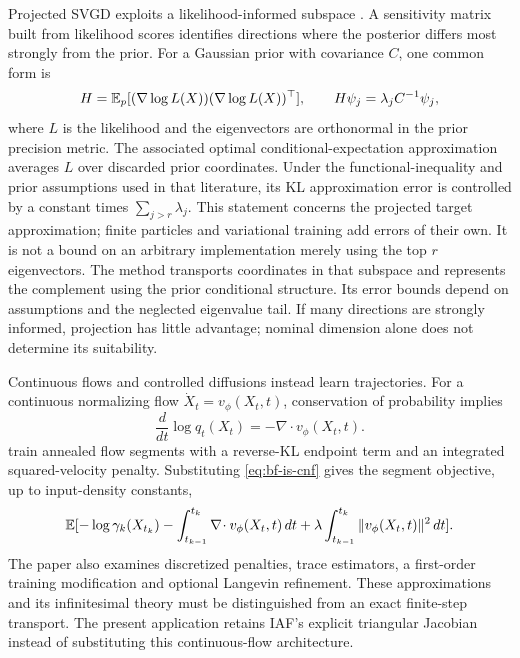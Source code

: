 Projected SVGD exploits a likelihood-informed subspace
\citep{chen2020psvgd}. A sensitivity matrix built from likelihood scores
identifies directions where the posterior differs most strongly from the prior.
For a Gaussian prior with covariance $C$, one common form is
\begin{equation}
 H=\mathbb{E}_p[(\nabla\log L(X))(\nabla\log L(X))^\top],\qquad
 H\psi_j=\lambda_j C^{-1}\psi_j,
 \label{eq:bf-is-informed-subspace}
\end{equation}
where $L$ is the likelihood and the eigenvectors are orthonormal in the prior
precision metric. The associated optimal conditional-expectation approximation
averages $L$ over discarded prior coordinates. Under the functional-inequality
and prior assumptions used in that literature, its KL approximation error is
controlled by a constant times $\sum_{j>r}\lambda_j$. This statement concerns
the projected target approximation; finite particles and variational training
add errors of their own. It is not a bound on an arbitrary implementation merely
using the top $r$ eigenvectors.
The method transports coordinates in that subspace and represents the
complement using the prior conditional structure. Its error bounds depend on
assumptions and the neglected eigenvalue tail. If many directions are strongly
informed, projection has little advantage; nominal dimension alone does not
determine its suitability.

Continuous flows and controlled diffusions instead learn trajectories. For a
continuous normalizing flow $\dot X_t=v_\phi(X_t,t)$, conservation of probability
implies
\begin{equation}
 \frac{d}{dt}\log q_t(X_t)=-\nabla\!\cdot v_\phi(X_t,t).
 \label{eq:bf-is-cnf}
\end{equation}
\citet[Proposition 3.1, Equation 10 and Appendix A]{wu2025annealing} train
annealed flow segments with a reverse-KL endpoint term and an integrated
squared-velocity penalty. Substituting \eqref{eq:bf-is-cnf} gives the segment
objective, up to input-density constants,
\begin{equation}
 \mathbb{E}[-\log\gamma_k(X_{t_k})
      -\int_{t_{k-1}}^{t_k}\nabla\!\cdot v_\phi(X_t,t)\,dt
      +\lambda\int_{t_{k-1}}^{t_k}\|v_\phi(X_t,t)\|^2\,dt].
 \label{eq:bf-is-annealing-flow}
\end{equation}
The paper also examines discretized penalties, trace estimators, a first-order
training modification and optional Langevin refinement. These approximations
and its infinitesimal theory must be distinguished from an exact finite-step
transport. The present application retains IAF's explicit triangular
Jacobian instead of substituting this continuous-flow architecture.

